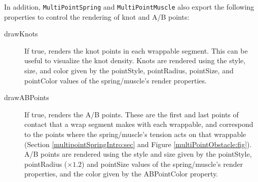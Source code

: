 In addition, {\tt MultiPointSpring} and {\tt MultiPointMuscle} also
export the following properties to control the rendering of knot and
A/B points:

\begin{description}

\item[drawKnots] If true, renders the knot points in each wrappable segment.
This can be useful to visualize the knot density. Knots are rendered
using the style, size, and color given by the {\sf pointStyle},
{\sf pointRadius}, {\sf pointSize}, and {\sf pointColor} values of the
spring/muscle's render properties.

\item[drawABPoints] If true, renders the A/B points. These
are the first and last points of contact that a wrap segment makes
with each wrappable, and correspond to the
points where the spring/muscle's tension acts on that wrappable
(Section \ref{multipointSpringIntro:sec} and
Figure \ref{multiPointObstacle:fig}).  A/B points are rendered using
the style and size given by the {\sf pointStyle}, {\sf pointRadius}
($\times 1.2$) and {\sf pointSize} values of the spring/muscle's render
properties, and the color given by the {\sf ABPointColor} property.

\end{description}
